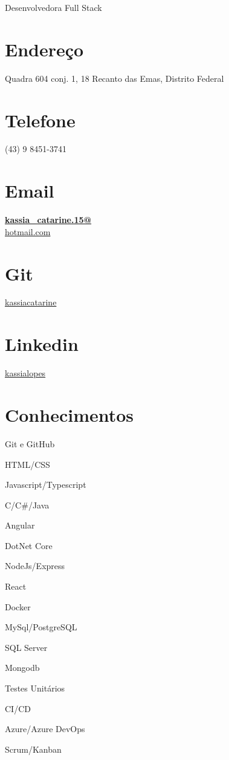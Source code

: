 \documentclass[]{friggeri-cv}
\begin{document}
      {Desenvolvedora Full Stack}
      

\begin{aside}
  \section{Endereço}
    Quadra 604 conj. 1, 18
    Recanto das Emas, Distrito Federal
    ~
  \section{Telefone}
    (43) 9 8451-3741
    ~
  \section{Email}
    \href{mailto:kassia_catarine.15@hotmail.com}{\textbf{kassia\_catarine.15@}\\hotmail.com}
    ~
  \section{Git}
    \href{https://github.com/kassiacatarine}{kassiacatarine}
    ~
    \section{Linkedin}
    \href{https://www.linkedin.com/in/kassialopes/}{kassialopes}
    ~
  \section{Conhecimentos}
    \item Git e GitHub
    \item HTML/CSS
    \item Javascript/Typescript
    \item C/C\#/Java
    \item Angular
    \item DotNet Core
    \item NodeJs/Express
    \item React
    \item Docker
    \item MySql/PostgreSQL
    \item SQL Server
    \item Mongodb
    \item Testes Unitários
    \item CI/CD
    \item Azure/Azure DevOps
    \item Scrum/Kanban
    ~

\end{aside}
\end{document}
